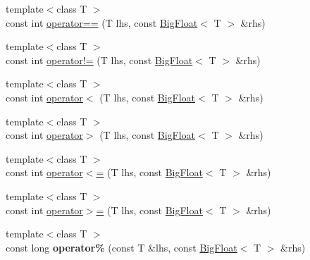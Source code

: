\begin{DoxyCompactItemize}
\item 
{\footnotesize template$<$class T $>$ }\\const int \hyperlink{namespaceatl_a2d8bf22cbfb80fddb5974aa6d73e38f5}{operator==} (T lhs, const \hyperlink{classatl_1_1_big_float}{Big\+Float}$<$ T $>$ \&rhs)
\item 
{\footnotesize template$<$class T $>$ }\\const int \hyperlink{namespaceatl_ae71088e3d54a6da4388b893d5cbdc738}{operator!=} (T lhs, const \hyperlink{classatl_1_1_big_float}{Big\+Float}$<$ T $>$ \&rhs)
\item 
{\footnotesize template$<$class T $>$ }\\const int \hyperlink{namespaceatl_aebf9ea7bd2cd4359a7b1921a27f0380b}{operator$<$} (T lhs, const \hyperlink{classatl_1_1_big_float}{Big\+Float}$<$ T $>$ \&rhs)
\item 
{\footnotesize template$<$class T $>$ }\\const int \hyperlink{namespaceatl_a865ee4ff4fdff0cb6bddc117bbe76612}{operator$>$} (T lhs, const \hyperlink{classatl_1_1_big_float}{Big\+Float}$<$ T $>$ \&rhs)
\item 
{\footnotesize template$<$class T $>$ }\\const int \hyperlink{namespaceatl_aa3c2e390f6ebc745e0f9319b53da2c3d}{operator$<$=} (T lhs, const \hyperlink{classatl_1_1_big_float}{Big\+Float}$<$ T $>$ \&rhs)
\item 
{\footnotesize template$<$class T $>$ }\\const int \hyperlink{namespaceatl_a61390a987bc461c11e825683add148de}{operator$>$=} (T lhs, const \hyperlink{classatl_1_1_big_float}{Big\+Float}$<$ T $>$ \&rhs)
\item 
\hypertarget{namespaceatl_a666415df8f7fcb110e1dc544e7221cf1}{{\footnotesize template$<$class T $>$ }\\const long {\bfseries operator\%} (const T \&lhs, const \hyperlink{classatl_1_1_big_float}{Big\+Float}$<$ T $>$ \&rhs)}\label{namespaceatl_a666415df8f7fcb110e1dc544e7221cf1}


\end{DoxyCompactItemize}
